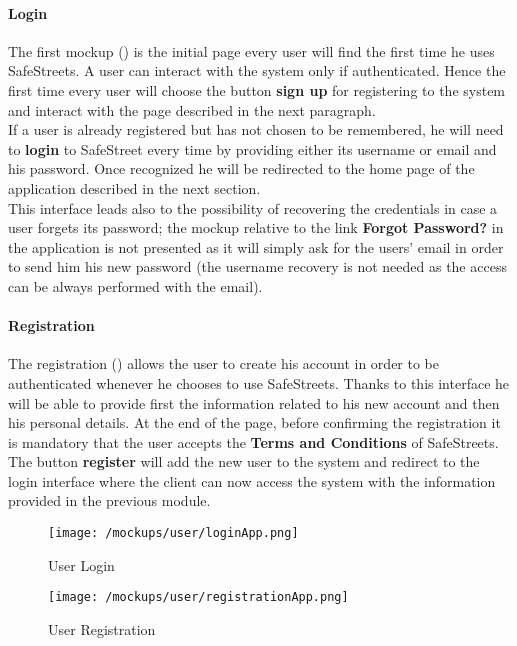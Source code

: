 			\paragraph{Login}
				The first mockup () is the initial page every user will find the first time he uses SafeStreets. A user can interact with the system only if authenticated. Hence the first time every user will choose the button \textbf{sign up} for registering to the system and interact with the page described in the next paragraph.\\
				
				If a user is already registered but has not chosen to be remembered, he will need to \textbf{login} to SafeStreet every time by providing either its username or email and his password. Once recognized he will be redirected to the home page of the application described in the next section.\\
				
				This interface leads also to the possibility of recovering the credentials in case a user forgets its password; the mockup relative to the link \textbf{Forgot Password?} in the application is not presented as it will simply ask for the users' email in order to send him his new password (the username recovery is not needed as the access can be always performed with the email).
				
			\paragraph{Registration}
				The registration () allows the user to create his account in order to be authenticated whenever he chooses to use SafeStreets. Thanks to this interface he will be able to provide first the information related to his new account and then his personal details. At the end of the page, before confirming the registration it is mandatory that the user accepts the \textbf{Terms and Conditions} of SafeStreets.\\
				
				The button \textbf{register} will add the new user to the system and redirect to the login interface where the client can now access the system with the information provided in the previous module.
				
			\vspace{0.6cm}
				
			\begin{figure}[ht!]
				\centering
				\begin{minipage}{0.5\textwidth}
					\centering
					\texttt{[image: /mockups/user/loginApp.png]}
					\caption{\label{fig:loginApp} User Login}
				\end{minipage}\hfill
				\begin{minipage}{0.5\textwidth}
					\centering
					\texttt{[image: /mockups/user/registrationApp.png]}
					\caption{\label{fig:registrationApp} User Registration}
				\end{minipage}
			\end{figure}
		
